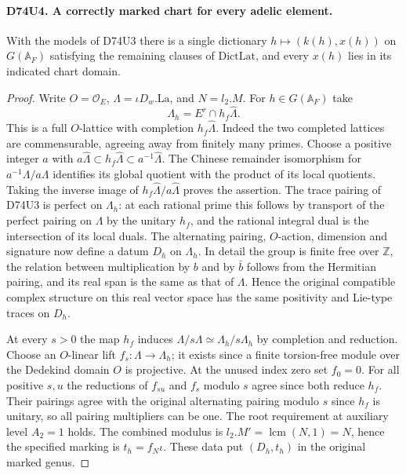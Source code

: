 \paragraph{D74U4. A correctly marked chart for every adelic element.}
\label{claim:D74U4}
With the models of D74U3 there is a single dictionary
$h\mapsto(k(h),x(h))$ on $G(\mathbb A_F)$ satisfying the remaining
clauses of $\mathrm{DictLat}$, and every $x(h)$ lies in its indicated
chart domain.

\begin{proof}
Write $O=\mathcal O_E$, $\Lambda=\iota D_w.\mathrm{La}$, and
$N=l_2.M$. For $h\in G(\mathbb A_F)$ take
\[
 \Lambda_h= E^r\cap h_f\widehat\Lambda.
\]
This is a full $O$-lattice with completion $h_f\widehat\Lambda$.
Indeed the two completed lattices are commensurable, agreeing away
from finitely many primes. Choose a positive integer $a$ with
$a\widehat\Lambda\subset h_f\widehat\Lambda\subset
a^{-1}\widehat\Lambda$. The Chinese remainder isomorphism for
$a^{-1}\Lambda/a\Lambda$ identifies its global quotient with the
product of its local quotients. Taking the inverse image of
$h_f\widehat\Lambda/a\widehat\Lambda$ proves the assertion.
The trace pairing of D74U3 is perfect on $\Lambda_h$: at each
rational prime this follows by transport of the perfect pairing
on $\Lambda$ by the unitary $h_f$, and the rational integral dual
is the intersection of its local duals. The alternating pairing,
$O$-action, dimension and signature now define a datum $D_h$ on
$\Lambda_h$. In detail the group is finite free over $\mathbb Z$,
the relation between multiplication by $b$ and by $\bar b$ follows
from the Hermitian pairing, and its real span is the same as that
of $\Lambda$. Hence the original compatible complex structure on
this real vector space has the same positivity and Lie-type traces
on $D_h$.

At every $s>0$ the map $h_f$ induces
$\Lambda/s\Lambda\simeq\Lambda_h/s\Lambda_h$ by completion and
reduction. Choose an $O$-linear lift
$f_s:\Lambda\to\Lambda_h$; it exists since a finite torsion-free
module over the Dedekind domain $O$ is projective. At the unused
index zero set $f_0=0$. For all positive $s,u$ the reductions of
$f_{su}$ and $f_s$ modulo $s$ agree since both reduce $h_f$.
Their pairings agree with the original alternating pairing modulo
$s$ since $h_f$ is unitary, so all pairing multipliers can be one.
The root requirement at auxiliary level $A_2=1$ holds. The combined
modulus is $l_2.M'=\operatorname{lcm}(N,1)=N$, hence the specified
marking is $t_h=f_N\iota$. These data put $(D_h,t_h)$ in the original marked
genus.


\end{proof}
